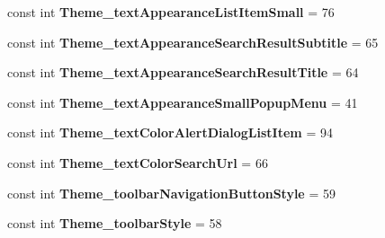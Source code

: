 \begin{DoxyCompactItemize}
\item 
\hypertarget{classClient_1_1Droid_1_1Resource_1_1Styleable_a3e7b0975efbc406d27fa980aff005ac8}{}const int {\bfseries Theme\+\_\+text\+Appearance\+List\+Item\+Small} = 76\label{classClient_1_1Droid_1_1Resource_1_1Styleable_a3e7b0975efbc406d27fa980aff005ac8}

\item 
\hypertarget{classClient_1_1Droid_1_1Resource_1_1Styleable_a88400ee96d4a33fec2ca121491eb25e3}{}const int {\bfseries Theme\+\_\+text\+Appearance\+Search\+Result\+Subtitle} = 65\label{classClient_1_1Droid_1_1Resource_1_1Styleable_a88400ee96d4a33fec2ca121491eb25e3}

\item 
\hypertarget{classClient_1_1Droid_1_1Resource_1_1Styleable_a1e4a3110b0cd98c3862aa32eabe1523f}{}const int {\bfseries Theme\+\_\+text\+Appearance\+Search\+Result\+Title} = 64\label{classClient_1_1Droid_1_1Resource_1_1Styleable_a1e4a3110b0cd98c3862aa32eabe1523f}

\item 
\hypertarget{classClient_1_1Droid_1_1Resource_1_1Styleable_a9d305e37a1b1fd28d37fb7cb7bcbc9f1}{}const int {\bfseries Theme\+\_\+text\+Appearance\+Small\+Popup\+Menu} = 41\label{classClient_1_1Droid_1_1Resource_1_1Styleable_a9d305e37a1b1fd28d37fb7cb7bcbc9f1}

\item 
\hypertarget{classClient_1_1Droid_1_1Resource_1_1Styleable_a0f7345e5f788221d41102bf7cd1547de}{}const int {\bfseries Theme\+\_\+text\+Color\+Alert\+Dialog\+List\+Item} = 94\label{classClient_1_1Droid_1_1Resource_1_1Styleable_a0f7345e5f788221d41102bf7cd1547de}

\item 
\hypertarget{classClient_1_1Droid_1_1Resource_1_1Styleable_a9cf2c2744f7c754362aaa13da6e1ad8b}{}const int {\bfseries Theme\+\_\+text\+Color\+Search\+Url} = 66\label{classClient_1_1Droid_1_1Resource_1_1Styleable_a9cf2c2744f7c754362aaa13da6e1ad8b}

\item 
\hypertarget{classClient_1_1Droid_1_1Resource_1_1Styleable_ab3762af02f9e18d30ab55619e5cf4578}{}const int {\bfseries Theme\+\_\+toolbar\+Navigation\+Button\+Style} = 59\label{classClient_1_1Droid_1_1Resource_1_1Styleable_ab3762af02f9e18d30ab55619e5cf4578}

\item 
\hypertarget{classClient_1_1Droid_1_1Resource_1_1Styleable_a712d52da60ace914ce9fd3b74524129c}{}const int {\bfseries Theme\+\_\+toolbar\+Style} = 58\label{classClient_1_1Droid_1_1Resource_1_1Styleable_a712d52da60ace914ce9fd3b74524129c}


\end{DoxyCompactItemize}
